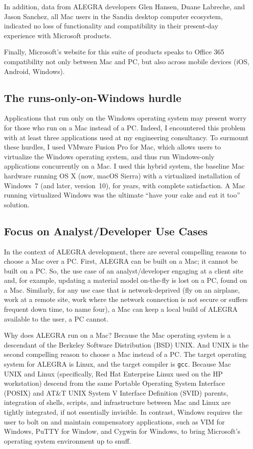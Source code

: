 \documentclass[10pt,twocolumn,reqno]{amsart}
\begin{document}
In addition, data from ALEGRA developers Glen Hansen, 
Duane Labreche, and Jason Sanchez, 
all Mac users in the Sandia desktop computer ecosystem, 
indicated no loss of functionality and compatibility 
in their present-day experience with Microsoft products.  

Finally, Microsoft's website for this suite of products 
speaks to Office 365 compatibility not only between Mac and PC, 
but also across mobile devices (iOS, Android, Windows).

\subsection{The runs-only-on-Windows hurdle}
Applications that run only on the Windows operating system 
may present worry for those who run on a Mac instead of a PC.  
Indeed, I encountered this problem with at least three applications 
used at my engineering consultancy.  
To surmount these hurdles, I used VMware Fusion Pro for Mac, 
which allows users to virtualize the Windows operating system, 
and thus run Windows-only applications concurrently on a Mac.  
I used this hybrid system, the baseline Mac hardware running OS X 
(now, macOS Sierra) with a virtualized installation of Windows~7 
(and later, version~10), for years, with complete satisfaction.  
A Mac running virtualized Windows was the 
ultimate ``have your cake and eat it too'' solution. 

\subsection{Focus on Analyst/Developer Use Cases}
In the context of ALEGRA development, there are several 
compelling reasons to choose a Mac over a PC.  
First, ALEGRA can be built on a Mac; it cannot be built on a PC.  
So, the use case of an analyst/developer engaging at a client site 
and, for example, 
updating a material model on-the-fly is lost on a PC, found on a Mac.  
Similarly, for any use case that is network-deprived 
(fly on an airplane, work at a remote site, 
work where the network connection is not secure or 
suffers frequent down time, to name four), 
a Mac can keep a local build of ALEGRA available to the user, 
a PC cannot.  

Why does ALEGRA run on a Mac?  
Because the Mac operating system is a descendant of the 
Berkeley Software Distribution (BSD) UNIX.  
And UNIX is the second compelling reason to choose a Mac instead of a PC.  
The target operating system for ALEGRA is Linux, 
and the target compiler is {\tt gcc}.  
Because Mac UNIX and Linux (specifically, Red Hat Enterprise Linux used
on the HP workstation) 
descend from the same Portable Operating System Interface (POSIX) 
and AT\&T UNIX System V Interface Definition (SVID) parents, 
integration of shells, scripts, and infrastructure 
between Mac and Linux are tightly integrated, 
if not essentially invisible.  
In contrast, Windows requires the user to bolt on and 
maintain compensatory applications, 
such as VIM for Windows, PuTTY for Window, and Cygwin for Windows, 
to bring Microsoft's operating system environment up to snuff.  
\end{document}
